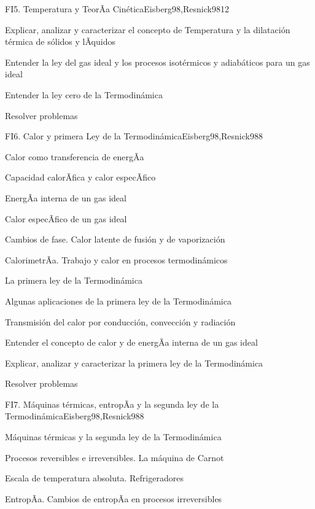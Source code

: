 \begin{syllabus}
\begin{unit}{FI5. Temperatura y TeorÃ­a Cinética}{Eisberg98,Resnick98}{12}
   \begin{unitgoals}
         \item  Explicar, analizar y caracterizar el concepto de Temperatura y la dilatación térmica de sólidos y lÃ­quidos
         \item  Entender la ley del gas ideal y los procesos isotérmicos y adiabáticos para un gas ideal
         \item  Entender la ley cero de la Termodinámica
         \item  Resolver problemas
   \end{unitgoals}
\end{unit}

\begin{unit}{FI6. Calor y primera Ley de la Termodinámica}{Eisberg98,Resnick98}{8}
\begin{topics}
         \item  Calor como transferencia de energÃ­a
	 \item  Capacidad calorÃ­fica y calor especÃ­fico
         \item  EnergÃ­a interna de un gas ideal
	 \item  Calor especÃ­fico de un gas ideal
         \item  Cambios de fase. Calor latente de fusión y de vaporización
	 \item  CalorimetrÃ­a. Trabajo y calor en procesos termodinámicos
         \item  La primera ley de la Termodinámica
	 \item  Algunas aplicaciones de la primera ley de la Termodinámica
         \item  Transmisión del calor por conducción, convección y radiación
   \end{topics}

   \begin{unitgoals}
         \item  Entender el concepto de calor y de energÃ­a interna de un gas ideal
         \item  Explicar, analizar y caracterizar la primera ley de la Termodinámica
         \item  Resolver problemas
   \end{unitgoals}
\end{unit}

\begin{unit}{FI7. Máquinas térmicas, entropÃ­a y la segunda ley de la Termodinámica}{Eisberg98,Resnick98}{8}
\begin{topics}
         \item  Máquinas térmicas y la segunda ley de la Termodinámica
	 \item  Procesos reversibles e irreversibles. La máquina de Carnot
         \item  Escala de temperatura absoluta. Refrigeradores
	 \item  EntropÃ­a. Cambios de entropÃ­a en procesos irreversibles
   \end{topics}


\end{unit}
\end{syllabus}
